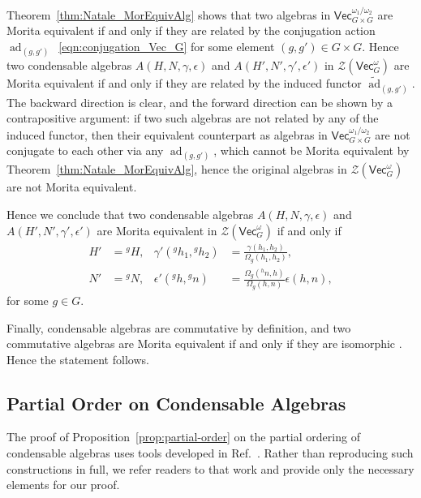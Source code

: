 \documentclass[aps,twocolumn,prx,floatfix,preprintnumbers, nofootinbib,10pt]{revtex4-2}
\numberwithin{equation}{section}
\theoremstyle{definition}
\newcommand{\nn}{\nonumber}
\newcommand{\wt}{\widetilde}
\newcommand{\cZ}{\mathcal{Z}}
\renewcommand{\Vec}{\mathsf{Vec}}
\def\ad{\mathop{\mathrm{ad}}\nolimits}
\begin{document}
Theorem~\ref{thm:Natale_MorEquivAlg} shows that two algebras in $\Vec_{G\times G}^{\omega_1/\omega_2}$ are Morita equivalent if and only if they are related by the conjugation action $\ad_{(g,g')}$~\eqref{eqn:conjugation_Vec_G} for some element $(g,g') \in G \times G$. Hence two condensable algebras $A(H, N, \gamma, \epsilon)$ and $A(H',N', \gamma', \epsilon')$ in $\cZ(\Vec_G^\omega)$ are Morita equivalent if and only if they are related by the induced functor $\wt{\ad}_{(g,g')}$. The backward direction is clear, and the forward direction can be shown by a contrapositive argument: if two such algebras are not related by any of the induced functor, then their equivalent counterpart as algebras in $\Vec_{G\times G}^{\omega_1/\omega_2}$ are not conjugate to each other via any $\ad_{(g,g')}$, which cannot be Morita equivalent by Theorem~\ref{thm:Natale_MorEquivAlg}, hence the original algebras in $\cZ(\Vec_G^\omega)$ are not Morita equivalent. 

Hence we conclude that two condensable algebras $A(H, N, \gamma, \epsilon)$ and $A(H',N', \gamma', \epsilon')$
are Morita equivalent in $\cZ(\Vec_{G}^\omega)$ if and only if 
\begin{align}
    H' & = {}^g\!H, & \gamma'({}^g h_1, {}^g h_2) & = \frac{\gamma(h_1,h_2)}{\Omega_g(h_1,h_2)},\nn\\
    N' & = {}^g\!N, & \epsilon'({}^{g}h, {}^{g}n) & =\frac{\Omega_g({}^{h}n,h)}{\Omega_g(h,n)}\epsilon(h,n),
\end{align}
for some $g\in G$.

Finally, condensable algebras are commutative by definition, and two commutative algebras are Morita equivalent if and only if they are isomorphic \cite{Kong:2007yv, DAVYDOV2010319}. Hence the statement follows.


\subsection{Partial Order on Condensable Algebras}
\label{append:partialorder}
The proof of Proposition~\ref{prop:partial-order} on the partial ordering of condensable algebras uses tools developed in Ref.~\cite{davydov2017lagrangian}. Rather than reproducing such constructions in full, we refer readers to that work and provide only the necessary elements for our proof.
\end{document}
